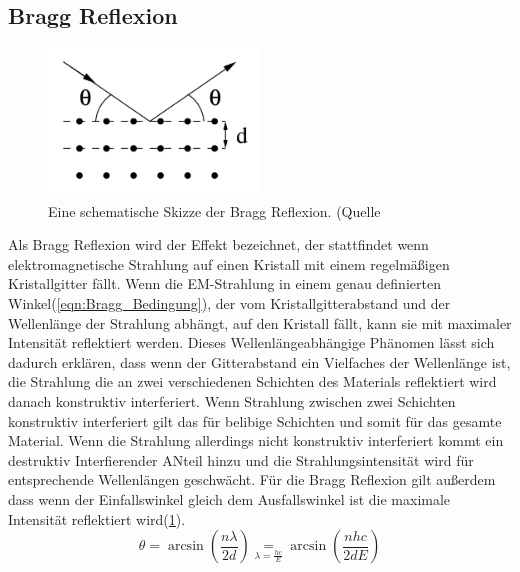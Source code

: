 \subsection{Bragg Reflexion}
\begin{figure}
    \centering
    \includegraphics[width=0.5\textwidth]{bilder/Bragg_Reflexion.png}
    \caption{Eine schematische Skizze der Bragg Reflexion. (Quelle \cite{Anleitung}}
    \label{fig:Bragg_Reflexion}
\end{figure}
Als Bragg Reflexion wird der Effekt bezeichnet, der stattfindet wenn elektromagnetische Strahlung auf einen Kristall mit einem regelmäßigen Kristallgitter fällt.
Wenn die EM-Strahlung in einem genau definierten Winkel(\ref{eqn:Bragg_Bedingung}), der vom Kristallgitterabstand und der Wellenlänge der Strahlung abhängt, auf den Kristall fällt, kann sie mit maximaler Intensität reflektiert werden.
Dieses Wellenlängeabhängige Phänomen lässt sich dadurch erklären, dass wenn der Gitterabstand ein Vielfaches der Wellenlänge ist, die Strahlung die an zwei verschiedenen Schichten des Materials reflektiert wird danach konstruktiv interferiert.
Wenn Strahlung zwischen zwei Schichten konstruktiv interferiert gilt das für belibige Schichten und somit für das gesamte Material. Wenn die Strahlung allerdings nicht konstruktiv interferiert kommt ein destruktiv Interfierender ANteil hinzu und die Strahlungsintensität wird für entsprechende Wellenlängen geschwächt.
Für die Bragg Reflexion gilt außerdem dass wenn der Einfallswinkel gleich dem Ausfallswinkel ist die maximale Intensität reflektiert wird(\ref{fig:Bragg_Reflexion}).
\begin{equation}
    \theta = \arcsin\left( \frac{n\lambda}{2d}\right) \underset{\lambda = \frac{hc}{E}}{=} \arcsin\left( \frac{n h c}{2dE}\right) \label{eqn:Bragg_Bedingung}
\end{equation}
